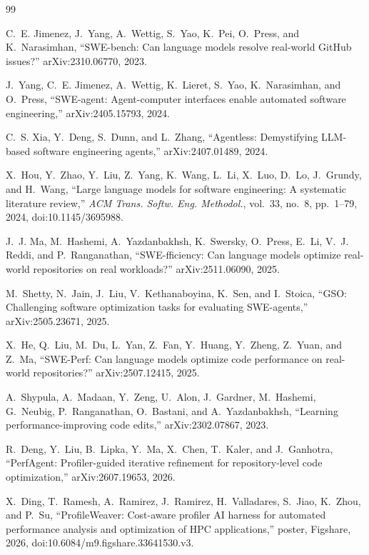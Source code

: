 \documentclass[conference]{IEEEtran}
\begin{document}

\begin{thebibliography}{99}

C.~E. Jimenez, J.~Yang, A.~Wettig, S.~Yao, K.~Pei, O.~Press, and K.~Narasimhan,
``{SWE}-bench: Can language models resolve real-world {GitHub} issues?''
arXiv:2310.06770, 2023.

J.~Yang, C.~E. Jimenez, A.~Wettig, K.~Lieret, S.~Yao, K.~Narasimhan, and O.~Press,
``{SWE}-agent: Agent-computer interfaces enable automated software engineering,''
arXiv:2405.15793, 2024.

C.~S. Xia, Y.~Deng, S.~Dunn, and L.~Zhang,
``Agentless: Demystifying {LLM}-based software engineering agents,''
arXiv:2407.01489, 2024.

X.~Hou, Y.~Zhao, Y.~Liu, Z.~Yang, K.~Wang, L.~Li, X.~Luo, D.~Lo, J.~Grundy, and H.~Wang,
``Large language models for software engineering: A systematic literature review,''
\emph{ACM Trans. Softw. Eng. Methodol.}, vol.~33, no.~8, pp.~1--79, 2024,
doi:10.1145/3695988.

J.~J. Ma, M.~Hashemi, A.~Yazdanbakhsh, K.~Swersky, O.~Press, E.~Li, V.~J. Reddi, and P.~Ranganathan,
``{SWE-fficiency}: Can language models optimize real-world repositories on real workloads?''
arXiv:2511.06090, 2025.

M.~Shetty, N.~Jain, J.~Liu, V.~Kethanaboyina, K.~Sen, and I.~Stoica,
``{GSO}: Challenging software optimization tasks for evaluating {SWE}-agents,''
arXiv:2505.23671, 2025.

X.~He, Q.~Liu, M.~Du, L.~Yan, Z.~Fan, Y.~Huang, Y.~Zheng, Z.~Yuan, and Z.~Ma,
``{SWE-Perf}: Can language models optimize code performance on real-world repositories?''
arXiv:2507.12415, 2025.

A.~Shypula, A.~Madaan, Y.~Zeng, U.~Alon, J.~Gardner, M.~Hashemi, G.~Neubig, P.~Ranganathan, O.~Bastani, and A.~Yazdanbakhsh,
``Learning performance-improving code edits,''
arXiv:2302.07867, 2023.

R.~Deng, Y.~Liu, B.~Lipka, Y.~Ma, X.~Chen, T.~Kaler, and J.~Ganhotra,
``{PerfAgent}: Profiler-guided iterative refinement for repository-level code optimization,''
arXiv:2607.19653, 2026.

X.~Ding, T.~Ramesh, A.~Ramirez, J.~Ramirez, H.~Valladares, S.~Jiao, K.~Zhou, and P.~Su,
``{ProfileWeaver}: Cost-aware profiler {AI} harness for automated performance analysis and optimization of {HPC} applications,''
poster, Figshare, 2026, doi:10.6084/m9.figshare.33641530.v3.


\end{thebibliography}
\end{document}
